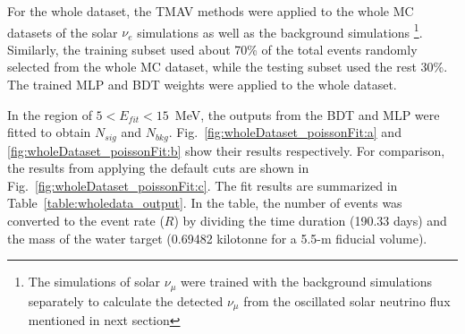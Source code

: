 For the whole dataset, the TMAV methods were applied to the whole MC datasets of the solar $\nu_e$ simulations as well as the background simulations \footnote{The simulations of solar $\nu_{\mu}$ were trained with the background simulations separately to calculate the detected $\nu_\mu$ from the oscillated solar neutrino flux mentioned in next section}. Similarly, the training subset used about 70\% of the total events randomly selected from the whole MC dataset, while the testing subset used the rest 30\%. The trained MLP and BDT weights were applied to the whole dataset.

In the region of $5<E_{fit}<15$~MeV, the outputs from the BDT and MLP were fitted to obtain $N_{sig}$ and $N_{bkg}$. Fig.~\ref{fig:wholeDataset_poissonFit:a} and \ref{fig:wholeDataset_poissonFit:b} show their results respectively. For comparison, the results from applying the default cuts are shown in Fig.~\ref{fig:wholeDataset_poissonFit:c}. The fit results are summarized in Table~\ref{table:wholedata_output}. In the table, the number of events was converted to the event rate ($R$) by dividing the time duration (190.33 days) and the mass of the water target (0.69482 kilotonne for a 5.5-m fiducial volume). 


